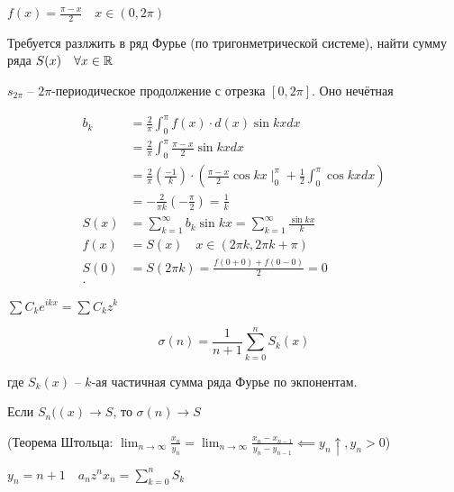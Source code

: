 \begin{example}
    $f(x) = \frac{\pi - x}{2}\quad x\in (0, 2\pi)$

    Требуется разлжить в ряд Фурье (по тригонметрической системе), найти сумму ряда $S(x)\quad \forall x\in \mathbb{R}$

    $s_{2\pi}$ -- $2\pi$-периодическое продолжение с отрезка $[0, 2\pi]$. Оно нечётная

    \begin{align*}
        b_k &= \frac{2}{\pi}\int_0^\pi f(x) \cdot d(x)\sin kx dx \\
        &= \frac{2}{\pi}\int_0^\pi \frac{\pi - x}{2}\sin kx dx \\
        &= \frac{2}{\pi} \left( \frac{-1}{k} \right)\cdot \left( \frac{\pi - x}{2}\cos kx \mid_0^\pi + \frac{1}{2}\int_0^\pi \cos kx dx \right)\\
        &= -\frac{2}{\pi k} \left( - \frac{\pi}{2} \right) = \frac{1}{k}  \\
        S(x) &= \sum_{k=1}^{\infty }b_k\sin kx = \sum_{k=1}^{\infty } \frac{\sin kx}{k}  \\
        f(x) &= S(x)\quad x\in \left( 2\pi k, 2\pi k + \pi \right)  \\
        S(0) &= S(2\pi k) = \frac{f(0+0) + f(0 - 0)}{2} = 0 \\
    .\end{align*}

    $\sum C_ke^{ikx} = \sum C_k z^k$
\end{example}

\begin{theorem}

    \[\sigma(n) = \frac{1}{n+1} \sum_{k=0}^{n} S_k(x)\]

    где $S_k(x)$ -- $k$-ая частичная сумма ряда Фурье по экпонентам.
\end{theorem}
\begin{note}

    Если $S_n((x) \to S$, то $\sigma(n) \to S$

    (Теорема Штольца: $\lim_{n \to \infty} \frac{x_n}{y_n} = \lim_{n \to \infty} \frac{x_n - x_{n-1}}{y_n - y_{n-1}} \impliedby y_n\uparrow, y_n>0$)

    $y_n = n+1\quad a_n z^nx_n = \sum_{k=0}^{n} S_k$
\end{note}

